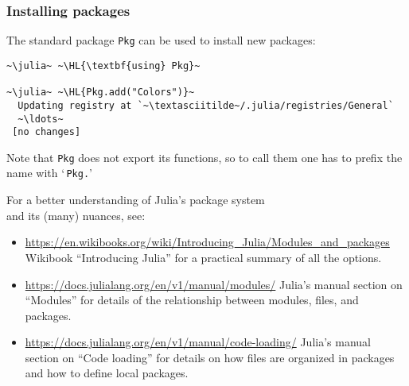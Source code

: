 \documentclass[english,serif,mathserif,xcolor=pdftex,dvipsnames,table]{beamer}
\begin{document}
\begin{frame}[fragile]
  \frametitle{Installing packages}
  The standard package \texttt{Pkg} can be used to install new packages:
\begin{lstlisting}
~\julia~ ~\HL{\textbf{using} Pkg}~

~\julia~ ~\HL{Pkg.add("Colors")}~
  Updating registry at `~\textasciitilde~/.julia/registries/General`
  ~\ldots~
 [no changes]
\end{lstlisting}

  Note that \texttt{\texttt{Pkg}} does not export its functions, so to
  call them one has to prefix the name with `\,\texttt{Pkg.}'
\end{frame}


\begin{frame}[fragile]
  \small

  For a better understanding of Julia's package system \\ and its (many) nuances, see:
  \begin{itemize}
  \+\item \url{https://en.wikibooks.org/wiki/Introducing_Julia/Modules_and_packages}
    Wikibook ``Introducing Julia'' for a practical summary of all the options.
  \+\item \url{https://docs.julialang.org/en/v1/manual/modules/} Julia's manual section on ``Modules'' for details of the relationship between modules, files, and packages.
  \+\item \url{https://docs.julialang.org/en/v1/manual/code-loading/}
    Julia's manual section on ``Code loading'' for details on how
    files are organized in packages and how to define local packages.
  \end{itemize}
\end{frame}
\end{document}
